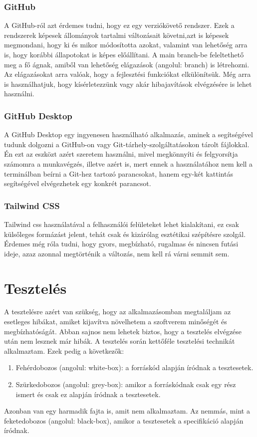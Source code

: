 \documentclass[]{thesis-ekf}
\theoremstyle{definition}
\theoremstyle{remark}
\begin{document}
	\subsection{GitHub}
		A GitHub-ról azt érdemes tudni, hogy ez egy verziókövető rendszer. Ezek a rendszerek képesek állományok tartalmi változásait követni,azt is képesek megmondani, hogy ki és mikor módosította azokat, valamint van lehetőség arra is, hogy korábbi állapotokat is képes előállítani. A main branch-be feleltethető meg a fő ágnak, amiből van lehetőség elágazások (angolul: branch) is létrehozni. Az elágazásokat arra valóak, hogy a fejlesztési funkciókat elkülönítsük. Még arra is használhatjuk, hogy kísérletezzünk vagy akár hibajavítások elvégzésére is lehet használni.
	\subsection{GitHub Desktop}
		A GitHub Desktop egy ingyenesen használható alkalmazás, aminek a segítségével tudunk dolgozni a GitHub-on vagy Git-tárhely-szolgáltatásokon tárolt fájlokkal. Én ezt az eszközt azért szeretem használni, mivel megkönnyíti és felgyorsítja számomra a munkavégzés, illetve azért is, mert ennek a használatához nem kell a terminálban beírni a Git-hez tartozó parancsokat, hanem egy-két kattintás segítségével elvégezhetek egy konkrét parancsot.
		\cite{GitHubDesktop}
	\subsection{Tailwind CSS}\label{sc-tailwind}
		Tailwind css használatával a felhasználói felületeket lehet kialakítani, ez csak külsőleges formázást jelent, tehát csak és kizárólag esztétikai szépítésre szolgál. Érdemes még róla tudni, hogy gyors, megbízható, rugalmas és nincsen futási ideje, azaz azonnal megtörténik a változás, nem kell rá várni semmit sem. \cite{tailwind}
	
	\chapter{Tesztelés}
		A tesztelésre azért van szükség, hogy az alkalmazásomban megtaláljam az esetleges hibákat, amiket kijavítva növelhetem a szoftverem minőségét és megbízhatóságát. Abban sajnos nem lehetek biztos, hogy a tesztelés elvégzése után nem lesznek már hibák. A tesztelés során kettőféle tesztelési technikát alkalmaztam. Ezek pedig a következők:
		\begin{enumerate}
			\item Fehérdobozos (angolul: white-box): a forráskód alapján íródnak a tesztesetek.
			\item Szürkedobozos (angolul: grey-box): amikor a forráskódnak csak egy rész ismert és csak ez alapján íródnak a tesztesetek.
		\end{enumerate}
		Azonban van egy harmadik fajta is, amit nem alkalmaztam. Az nemmás, mint a feketedobozos (angolul: black-box), amikor a tesztesetek a specifikáció alapján íródnak.
		\cite[26-29.~oldal]{Kusper}
\end{document}
